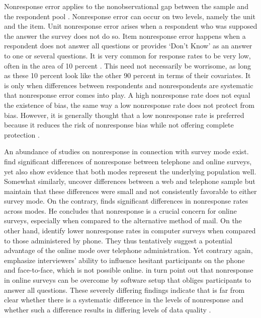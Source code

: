 \documentclass[12pt,]{article}
\begin{document}
Nonresponse error applies to the nonobservational gap between the sample
and the respondent pool \citep{groves_survey_2009}. Nonresponse error
can occur on two levels, namely the unit and the item. Unit nonresponse
error arises when a respondent who was supposed the answer the survey
does not do so. Item nonresponse error happens when a respondent does
not answer all questions or provides `Don't Know' as an answer to one or
several questions. It is very common for response rates to be very low,
often in the area of 10 percent \citep{groves_survey_2009}. This need
not necessarily be worrisome, as long as these 10 percent look like the
other 90 percent in terms of their covariates. It is only when
differences between respondents and nonrespondents are systematic that
nonresponse error comes into play. A high nonresponse rate does not
equal the existence of bias, the same way a low nonresponse rate does
not protect from bias. However, it is generally thought that a low
nonresponse rate is preferred because it reduces the risk of nonresponse
bias while not offering complete protection \citep{weisberg_2005_total}.

An abundance of studies on nonresponse in connection with survey mode
exist. \citet{atkeson_2014_nonresponse} find significant differences of
nonresponse between telephone and online surveys, yet also show evidence
that both modes represent the underlying population well. Somewhat
similarly, \citet{nagelhout_2010_interviewing} uncover differences
between a web and telephone sample but maintain that these differences
were small and not consistently favorable to either survey mode. On the
contrary, \citet{couper_2001_promises} finds significant differences in
nonresponse rates across modes. He concludes that nonresponse is a
crucial concern for online surveys, especially when compared to the
alternative method of mail. On the other hand,
\citet{chang_2010_comparing} identify lower nonresponse rates in
computer surveys when compared to those administered by phone. They thus
tentatively suggest a potential advantage of the online mode over
telephone administration. Yet contrary again,
\citet{west_2013_interviewer} emphasize interviewers' ability to
influence hesitant participants on the phone and face-to-face, which is
not possible online. \citet{dillman_2005_survey} in turn point out that
nonresponse in online surveys can be overcome by software setup that
obliges participants to answer all questions. These severely differing
findings indicate that is far from clear whether there is a systematic
difference in the levels of nonresponse and whether such a difference
results in differing levels of data quality
\citep{groves_2010_total, mcnabb_2013_nonsampling, millar_2012_mail, aapor_2013_report}.
\end{document}
